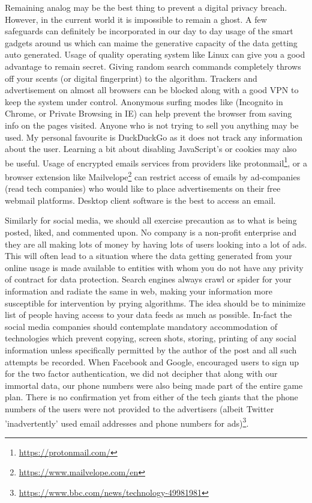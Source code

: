 \begin{multicols}{2}
Remaining analog may be the best thing to prevent a digital privacy breach. However, in the current world it is impossible to remain a ghost. A few safeguards can definitely be incorporated in our day to day usage of the smart gadgets around us which can maime the generative capacity of the data getting auto generated. Usage of quality operating system like Linux can give you a good advantage to remain secret. Giving random search commands completely throws off your scents (or digital fingerprint) to the algorithm. Trackers and advertisement on almost all browsers can be blocked along with a good VPN to keep the system under control.  Anonymous surfing modes like (Incognito in Chrome, or Private Browsing in IE) can help prevent the browser from saving info on the pages visited. Anyone who is not trying to sell you anything may be used. My personal favourite is DuckDuckGo as it does not track any information about the user. Learning a bit about disabling JavaScript’s or cookies may also be useful. Usage of encrypted emails services from providers like protonmail\footnote{\url{ https://protonmail.com/}}, or a browser extension like Mailvelope\footnote{\url{https://www.mailvelope.com/en}} can restrict access of emails by ad-companies (read tech companies) who would like to place advertisements on their free webmail platforms. Desktop client software is the best to access an email.

Similarly for social media, we should all exercise precaution as to what is being posted, liked, and commented upon. No company is a non-profit enterprise and they are all making lots of money by having lots of users looking into a lot of ads. This will often lead to a situation where the data getting generated from your online usage is made available to entities with whom you do not have any privity of contract for data protection. Search engines always crawl or spider for your information and radiate the same in web, making your information more susceptible for intervention by prying algorithms. The idea should be to minimize list of people having access to your data feeds as much as possible. In-fact the social media companies should contemplate mandatory accommodation of technologies which prevent copying, screen shots, storing, printing of any social information unless specifically permitted by the author of the post and all such attempts be recorded. When Facebook and Google, encouraged users to sign up for the two factor authentication, we did not decipher that along with our immortal data, our phone numbers were also being made part of the entire game plan. There is no confirmation yet from either of the tech giants that the phone numbers of the users were not provided to the advertisers (albeit Twitter 'inadvertently' used email addresses and phone numbers for ads)\footnote{\url{https://www.bbc.com/news/technology-49981981}}. 


\end{multicols}

